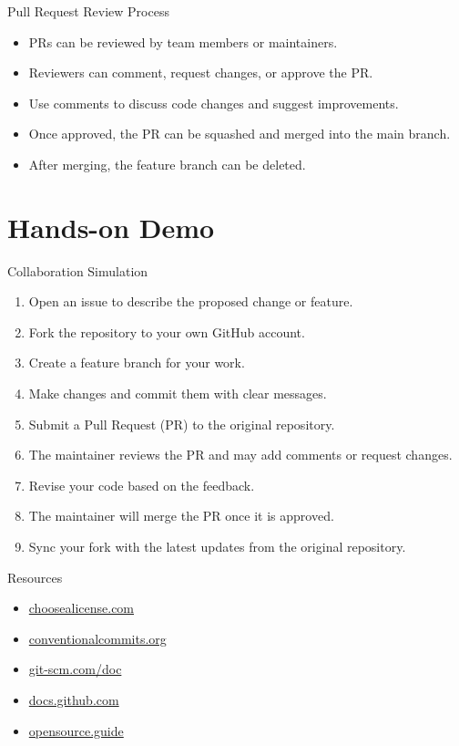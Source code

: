 \documentclass[12pt]{beamer}
\begin{document}
\begin{frame}{Pull Request Review Process}
  \begin{itemize}
    \setlength\itemsep{1em}
    \item PRs can be reviewed by team members or maintainers.
    \item Reviewers can comment, request changes, or approve the PR.
    \item Use comments to discuss code changes and suggest improvements.
    \item Once approved, the PR can be squashed and merged into the main branch.
    \item After merging, the feature branch can be deleted.
  \end{itemize}

\end{frame}

\section{Hands-on Demo}


\begin{frame}{Collaboration Simulation}
  
  \begin{enumerate}
    \setlength\itemsep{0.5em}
    \item Open an issue to describe the proposed change or feature.
    \item Fork the repository to your own GitHub account.
    \item Create a feature branch for your work.
    \item Make changes and commit them with clear messages.
    \item Submit a Pull Request (PR) to the original repository.
    \item The maintainer reviews the PR and may add comments or request changes.    \item Revise your code based on the feedback.
    \item The maintainer will merge the PR once it is approved.
    \item Sync your fork with the latest updates from the original repository.
  \end{enumerate}
\end{frame}

\begin{frame}{Resources}
  \begin{itemize}
    \setlength\itemsep{1em}
    \item \href{https://choosealicense.com}{choosealicense.com}
    \item \href{https://www.conventionalcommits.org/en/v1.0.0/}{conventionalcommits.org}
    \item \href{https://git-scm.com/doc}{git-scm.com/doc}
    \item \href{https://docs.github.com}{docs.github.com}
    \item \href{https://opensource.guide/}{opensource.guide}
  \end{itemize}
\end{frame}
\end{document}
